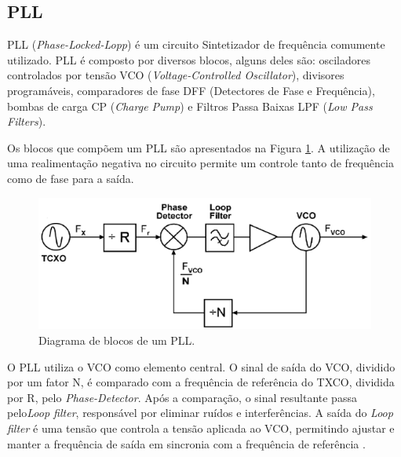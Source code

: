 \subsection{PLL}
PLL (\textit{Phase-Locked-Lopp}) é um circuito Sintetizador de frequência comumente utilizado. PLL é composto por diversos blocos, alguns deles são: osciladores controlados por tensão VCO (\textit{Voltage-Controlled Oscillator}), divisores programáveis, comparadores de fase DFF (Detectores de Fase e Frequência), bombas de carga CP (\textit{Charge Pump}) e Filtros Passa Baixas LPF (\textit{Low Pass Filters}). 

Os blocos que compõem um PLL são apresentados na Figura \ref{fig:pll_blocks}.
A utilização de uma realimentação negativa no circuito permite um controle tanto de frequência como de fase para a saída.

\begin{figure}[h!]
	\caption{Diagrama de blocos de um PLL.}
	\begin{center}
		\includegraphics[scale=0.6]{img/pll_blocos.png}
	\end{center}
	\label{fig:pll_blocks}
\end{figure}

O PLL utiliza o VCO como elemento central. O sinal de saída do VCO, dividido por um fator N, é comparado com a frequência de referência do TXCO, dividida por R, pelo  \textit{Phase-Detector}. Após a comparação, o sinal resultante passa pelo\textit{Loop filter}, responsável por eliminar ruídos e interferências. A saída do \textit{Loop filter} é uma tensão que controla a tensão aplicada ao VCO, permitindo ajustar e manter a frequência de saída em sincronia com a frequência de referência \cite{barrett_1999_fractionalintegern}.

